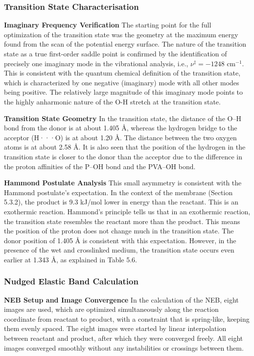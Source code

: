 \documentclass[12pt,a4paper]{report}
\begin{document}
\subsubsection{Transition State Characterisation}

\textbf{Imaginary Frequency Verification}
The starting point for the full optimization of the transition state was the geometry at the maximum energy found from the scan of the potential energy surface. The nature of the transition state as a true first-order saddle point is confirmed by the identification of precisely one imaginary mode in the vibrational analysis, i.e., \(\nu^{\ddagger} = -1248\) cm\(^{-1}\).\cite{81,83} This is consistent with the quantum chemical definition of the transition state, which is characterized by one negative (imaginary) mode with all other modes being positive. The relatively large magnitude of this imaginary mode points to the highly anharmonic nature of the O-H stretch at the transition state.

\textbf{Transition State Geometry}
In the transition state, the distance of the O–H bond from the donor is at about 1.405 Å, whereas the hydrogen bridge to the acceptor (H···O) is at about 1.20 Å. The distance between the two oxygen atoms is at about 2.58 Å. It is also seen that the position of the hydrogen in the transition state is closer to the donor than the acceptor due to the difference in the proton affinities of the P–OH bond and the PVA–OH bond.\cite{97, 98}

\textbf{Hammond Postulate Analysis}
This small asymmetry is consistent with the Hammond postulate’s expectation. In the context of the membrane (Section 5.3.2), the product is 9.3 kJ/mol lower in energy than the reactant. This is an exothermic reaction. Hammond’s principle\cite{82,83} tells us that in an exothermic reaction, the transition state resembles the reactant more than the product. This means the position of the proton does not change much in the transition state. The donor position of 1.405 Å is consistent with this expectation. However, in the presence of the wet and crosslinked medium, the transition state occurs even earlier at 1.343 Å, as explained in Table 5.6.

\subsubsection{Nudged Elastic Band Calculation}

\textbf{NEB Setup and Image Convergence}
In the calculation of the NEB, eight images are used, which are optimized simultaneously along the reaction coordinate from reactant to product, with a constraint that is spring-like, keeping them evenly spaced.\cite{89,90,91} The eight images were started by linear interpolation between reactant and product, after which they were converged freely. All eight images converged smoothly without any instabilities or crossings between them.
\end{document}
